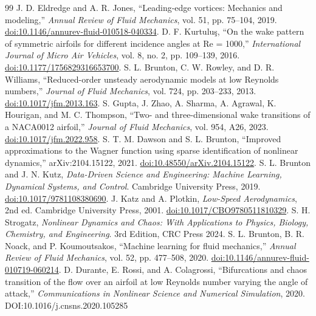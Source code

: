 \begin{thebibliography}{99}
 J. D. Eldredge and A. R. Jones, ``Leading-edge vortices: Mechanics and modeling,'' \emph{Annual Review of Fluid Mechanics}, vol. 51, pp. 75--104, 2019. \href{https://doi.org/10.1146/annurev-fluid-010518-040334}{doi:10.1146/annurev-fluid-010518-040334}.
 D. F. Kurtulu\c{s}, ``On the wake pattern of symmetric airfoils for different incidence angles at Re = 1000,'' \emph{International Journal of Micro Air Vehicles}, vol. 8, no. 2, pp. 109--139, 2016. \href{https://doi.org/10.1177/1756829316653700}{doi:10.1177/1756829316653700}.
 S. L. Brunton, C. W. Rowley, and D. R. Williams, ``Reduced-order unsteady aerodynamic models at low Reynolds numbers,'' \emph{Journal of Fluid Mechanics}, vol. 724, pp. 203--233, 2013. \href{https://doi.org/10.1017/jfm.2013.163}{doi:10.1017/jfm.2013.163}.
 S. Gupta, J. Zhao, A. Sharma, A. Agrawal, K. Hourigan, and M. C. Thompson, ``Two- and three-dimensional wake transitions of a NACA0012 airfoil,'' \emph{Journal of Fluid Mechanics}, vol. 954, A26, 2023. \href{https://doi.org/10.1017/jfm.2022.958}{doi:10.1017/jfm.2022.958}.
 S. T. M. Dawson and S. L. Brunton, ``Improved approximations to the Wagner function using sparse identification of nonlinear dynamics,'' arXiv:2104.15122, 2021. \href{https://doi.org/10.48550/arXiv.2104.15122}{doi:10.48550/arXiv.2104.15122}.
 S. L. Brunton and J. N. Kutz, \emph{Data-Driven Science and Engineering: Machine Learning, Dynamical Systems, and Control}. Cambridge University Press, 2019. \href{https://doi.org/10.1017/9781108380690}{doi:10.1017/9781108380690}.
 J. Katz and A. Plotkin, \emph{Low-Speed Aerodynamics}, 2nd ed. Cambridge University Press, 2001. \href{https://doi.org/10.1017/CBO9780511810329}{doi:10.1017/CBO9780511810329}.
 S. H. Strogatz, \emph{Nonlinear Dynamics and Chaos: With Applications to Physics, Biology, Chemistry, and Engineering}. 3rd Edition, CRC Press 2024.
 S. L. Brunton, B. R. Noack, and P. Koumoutsakos, ``Machine learning for fluid mechanics,'' \emph{Annual Review of Fluid Mechanics}, vol. 52, pp. 477--508, 2020. \href{https://doi.org/10.1146/annurev-fluid-010719-060214}{doi:10.1146/annurev-fluid-010719-060214}.
 D. Durante, E. Rossi, and A. Colagrossi, ``Bifurcations and chaos transition of the flow over an airfoil at low Reynolds number varying the angle of attack,'' \emph{Communications in Nonlinear Science and Numerical Simulation}, 2020. DOI:10.1016/j.cnsns.2020.105285

\end{thebibliography}
